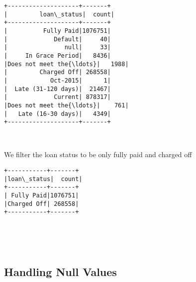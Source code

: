 \documentclass[11pt]{article}
\begin{document}
    \begin{Verbatim}[commandchars=\\\{\}]
+--------------------+-------+
|         loan\_status|  count|
+--------------------+-------+
|          Fully Paid|1076751|
|             Default|     40|
|                null|     33|
|     In Grace Period|   8436|
|Does not meet the{\ldots}|   1988|
|         Charged Off| 268558|
|            Oct-2015|      1|
|  Late (31-120 days)|  21467|
|             Current| 878317|
|Does not meet the{\ldots}|    761|
|   Late (16-30 days)|   4349|
+--------------------+-------+

    \end{Verbatim}

    \begin{center}
    \end{center}
    { \hspace*{\fill} \\}
    
    We filter the loan status to be only fully paid and charged off

    \begin{Verbatim}[commandchars=\\\{\}]
+-----------+-------+
|loan\_status|  count|
+-----------+-------+
| Fully Paid|1076751|
|Charged Off| 268558|
+-----------+-------+

    \end{Verbatim}

    \begin{center}
    \end{center}
    { \hspace*{\fill} \\}
    
    \begin{center}
    \end{center}
    { \hspace*{\fill} \\}
    
    \hypertarget{handling-null-values}{%
\subsection{Handling Null Values}\label{handling-null-values}}
\end{document}
